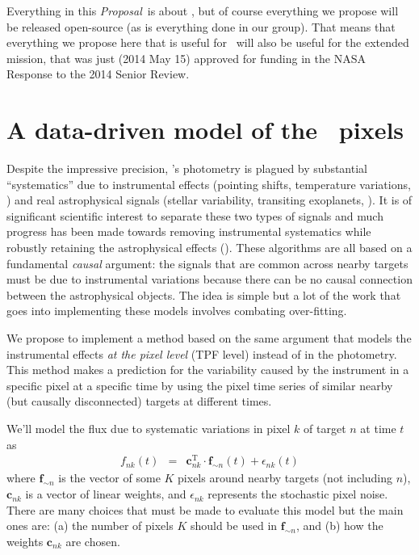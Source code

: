 \documentclass[letterpaper,12pt,preprint]{hack_aastex}
\newcommand{\bvec}[1]{{\ensuremath{{\boldsymbol{#1}}}}}
\newcommand{\documentname}{\textsl{Proposal}}
\begin{document}
Everything in this \documentname\ is about \Kepler, but of course everything we
propose will be released open-source (as is everything done in our group).
That means that everything we propose here that is useful for \Kepler\ will
also be useful for the  extended mission, that was just (2014 May 15)
approved for funding in the NASA Response to the 2014 Senior Review.

\section{A data-driven model of the \Kepler\ pixels}

Despite the impressive precision, \Kepler's photometry is plagued by
substantial ``systematics'' due to instrumental effects (pointing shifts,
temperature variations, \etc) and real astrophysical signals (stellar
variability, transiting exoplanets, \etc).
It is of significant scientific interest to separate these two types of
signals and much progress has been made towards removing instrumental
systematics while robustly retaining the astrophysical effects
(\citealt{pdc1, pdc2, arc}).
These algorithms are all based on a fundamental \emph{causal} argument: the
signals that are common across nearby targets must be due to instrumental
variations because there can be no causal connection between the astrophysical
objects.
The idea is simple but a lot of the work that goes into implementing these
models involves combating over-fitting.

We propose to implement a method based on the same argument that models the
instrumental effects \emph{at the pixel level} (TPF level)
instead of in the photometry.
This method makes a prediction for the variability caused by the instrument in
a specific pixel at a specific time by using the pixel time series of similar
nearby (but causally disconnected) targets at different times.

We'll model the flux due to systematic variations in pixel $k$ of target
$n$ at time $t$ as
\begin{eqnarray}
f_{nk}(t) &=& \bvec{c}_{nk}^\mathrm{T}\cdot\bvec{f}_{\sim n}(t)
              + \epsilon_{nk}(t)
\end{eqnarray}
where $\bvec{f}_{\sim n}$ is the vector of some $K$ pixels around nearby
targets (not including $n$), $\bvec{c}_{nk}$ is a vector of linear weights,
and $\epsilon_{nk}$ represents the stochastic pixel noise.
There are many choices that must be made to evaluate this model but the main
ones are: (a) the number of pixels $K$ should be used in $\bvec{f}_{\sim n}$,
and (b) how the weights $\bvec{c}_{nk}$ are chosen.
\end{document}
